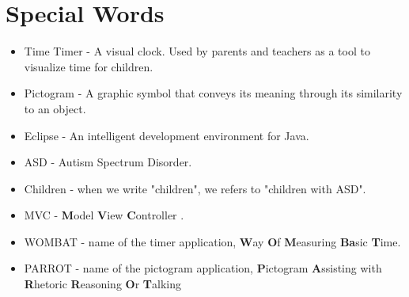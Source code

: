 \chapter*{Special Words}

\begin{itemize}

	\item Time Timer - A visual clock. Used by parents and teachers as a tool to visualize time for children.
	\item Pictogram - A graphic symbol that conveys its meaning through its similarity to an object.
	\item Eclipse - An intelligent development environment for Java.
	\item ASD - Autism Spectrum Disorder.
	\item Children - when we write "children", we refers to "children with ASD".
	\item MVC - \textbf{M}odel \textbf{V}iew \textbf{C}ontroller \cite{MVC}.
	\item WOMBAT - name of the timer application, \textbf{W}ay \textbf{O}f \textbf{M}easuring \textbf{Ba}sic \textbf{T}ime.
	\item PARROT - name of the pictogram application, \textbf{P}ictogram \textbf{A}ssisting with \textbf{R}hetoric \textbf{R}easoning \textbf{O}r \textbf{T}alking

\end{itemize}